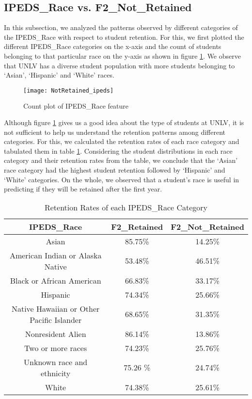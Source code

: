 \documentclass[11pt,openright]{report}
\begin{document}
\subsection {IPEDS\_Race vs. F2\_Not\_Retained}
In this subsection, we analyzed the patterns observed by different categories of the IPEDS\_Race with respect to student retention. For this, we first plotted the different IPEDS\_Race categories on the x-axis and the count of students belonging to that particular race on the y-axis as shown in figure \ref{fig:ipeds_F2NotRetained_plot}. We observe that UNLV has a diverse student population with more students belonging to `Asian', `Hispanic' and `White' races.


\begin{figure}[!htb]
	\centering
	\texttt{[image: NotRetained\_ipeds]}
	\caption{Count plot of IPEDS\_Race feature}
	\label{fig:ipeds_F2NotRetained_plot}
\end{figure}



Although figure \ref{fig:ipeds_F2NotRetained_plot} gives us a good idea about the type of students at UNLV, it is not sufficient to help us understand the retention patterns among different categories. For this, we calculated the retention rates of each race category and tabulated them in table \ref{table:ipeds_race_retentions}. Considering the student distributions in each race category and their retention rates from the table, we conclude that the `Asian' race category had the highest student retention followed by `Hispanic' and `White' categories. On the whole, we observed that a student's race is useful in predicting if they will be retained after the first year.

 \begin{table}[!ht]
	\renewcommand{\arraystretch}{1.3}
	\caption{Retention Rates of each IPEDS\_Race Category}
	\label{table:ipeds_race_retentions}
	\centering
	\begin{tabular}{|c|c|c|}
		\hline
		\bfseries IPEDS\_Race & \bfseries F2\_Retained & \bfseries F2\_Not\_Retained\\
		\hline
		Asian & 85.75\% & 14.25\% \\ \hline
		American Indian or Alaska Native & 53.48\% & 46.51\% \\ \hline
		Black or African American & 66.83\% & 33.17\% \\ \hline
		Hispanic & 74.34\% & 25.66\% \\ \hline
		Native Hawaiian or Other Pacific Islander & 68.65\% & 31.35\% \\ \hline
		Nonresident Alien & 86.14\% & 13.86\% \\ \hline
		Two or more races &  74.23\% &  25.76\% \\ \hline
		Unknown race and ethnicity & 75.26 \% & 24.74\% \\ \hline
		White & 74.38\% & 25.61\% \\ \hline
	\end{tabular}
\end{table}
\end{document}

